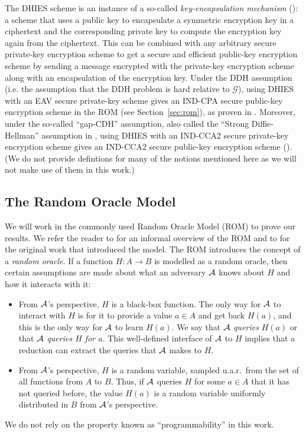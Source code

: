 The DHIES scheme is an instance of a so-called \emph{key-encapsulation mechanism} (\cite[Definition~12.9]{introduction-to-modern-cryptography}): a scheme that uses a public key to encapsulate a symmetric encryption key in a ciphertext and the corresponding private key to compute the encryption key again from the ciphertext. This can be combined with any arbitrary secure private-key encryption scheme to get a secure and efficient public-key encryption scheme by sending a message encrypted with the private-key encryption scheme along with an encapsulation of the encryption key.
Under the DDH assumption (i.e. the assumption that the DDH problem is hard relative to $\mathcal{G}$), using DHIES with an EAV secure private-key scheme gives an IND-CPA secure public-key encryption scheme in the ROM (see Section~\vref{sec:rom}), as proven in \cite[Theorem~12.12]{introduction-to-modern-cryptography}. Moreover, under the so-called ``gap-CDH'' assumption, also called the ``Strong Diffie-Hellman'' assumption in \cite{dhies}, using DHIES with an IND-CCA2 secure private-key encryption scheme gives an IND-CCA2 secure public-key encryption scheme (\cite[Theorem~12.22]{introduction-to-modern-cryptography}). (We do not provide defintions for many of the notions mentioned here as we will not make use of them in this work.)


\subsection{The Random Oracle Model} \label{sec:rom}

We will work in the commonly used Random Oracle Model (ROM) to prove our results. We refer the reader to \cite[Chapter 6.5]{introduction-to-modern-cryptography} for an informal overview of the ROM and to \cite{rom} for the original work that introduced the model. The ROM introduces the concept of a \emph{random oracle}. If a function $H : A \to B$ is modelled as a random oracle, then certain assumptions are made about what an adversary $\mathcal{A}$ knows about $H$ and how it interacts with it:
\begin{itemize}
	\item From $\mathcal{A}$'s perspective, $H$ is a black-box function. The only way for $\mathcal{A}$ to interact with $H$ is for it to provide a value $a \in A$ and get back $H(a)$, and this is the only way for $\mathcal{A}$ to learn $H(a)$. We say that $\mathcal{A}$ \emph{queries} $H(a)$ or that $\mathcal{A}$ \emph{queries $H$ for $a$}. This well-defined interface of $\mathcal{A}$ to $H$ implies that a reduction can extract the queries that $\mathcal{A}$ makes to $H$.
	\item From $\mathcal{A}$'s perspective, $H$ is a random variable, sampled u.a.r.\ from the set of all functions from $A$ to $B$. Thus, if $\mathcal{A}$ queries $H$ for some $a \in A$ that it has not queried before, the value $H(a)$ is a random variable uniformly distributed in $B$ from $\mathcal{A}$'s perspective.
\end{itemize}
We do not rely on the property known as ``programmability'' in this work.
